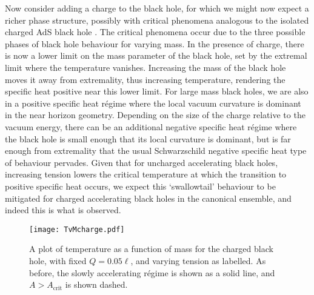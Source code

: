 \documentclass[
twoside,
openright,
frontopenright,
]{dmathesis}
\begin{document}
Now consider adding a charge to the black hole, for which we might now expect a
richer phase structure, possibly with critical phenomena analogous to the
isolated charged AdS black hole
\cite{Chamblin:1999tk,Cvetic:1999ne,Chamblin:1999hg}. The critical phenomena
occur due to the three possible phases of black hole behaviour for varying mass.
In the presence of charge, there is now a lower limit on the mass parameter of
the black hole, set by the extremal limit where the temperature vanishes.
Increasing the mass of the black hole moves it away from extremality, thus
increasing temperature, rendering the specific heat positive near this lower
limit. For large mass black holes, we are also in a positive specific heat
r\'egime where the local vacuum curvature is dominant in the near horizon
geometry.  Depending on the size of the charge relative to the vacuum energy,
there can be an additional negative specific heat r\'egime where the black hole
is small enough that its local curvature is dominant, but is far enough from
extremality that the usual Schwarzschild negative specific heat type of
behaviour pervades.  Given that for uncharged accelerating black holes,
increasing tension lowers the critical temperature at which the transition to
positive specific heat occurs, we expect this `swallowtail' behaviour to be
mitigated for charged accelerating black holes in the canonical ensemble, and
indeed this is what is observed.
\begin{figure}
  \centering
  \texttt{[image: TvMcharge.pdf]}
  \caption{\label{fig:TvMcharge}A plot of temperature as a function of mass for
    the charged black hole, with fixed $Q=0.05\ell$, and varying tension as
    labelled. As before, the slowly accelerating r\'egime is shown as a solid
    line, and $A>A_\mathrm{crit}$ is shown dashed.}
\end{figure}
\end{document}
